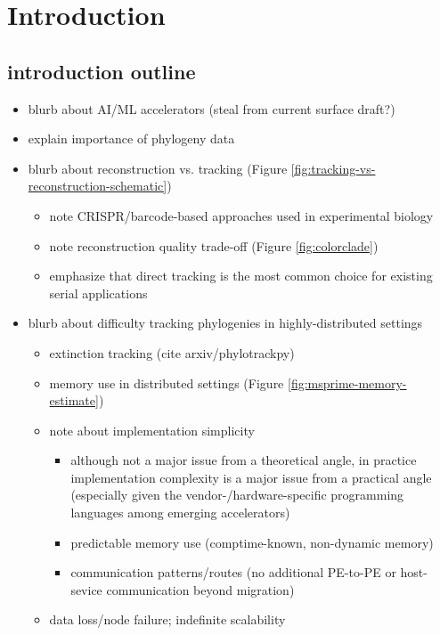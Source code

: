 \section{Introduction} \label{sec:introduction}

\subsection{introduction outline}

\begin{itemize}
\item blurb about AI/ML accelerators (steal from current surface draft?)
\item explain importance of phylogeny data
\item blurb about reconstruction vs. tracking (Figure \ref{fig:tracking-vs-reconstruction-schematic})
    \begin{itemize}
    \item note CRISPR/barcode-based approaches used in experimental biology
    \item note reconstruction quality trade-off (Figure \ref{fig:colorclade})
    \item emphasize that direct tracking is the most common choice for existing serial applications
    \end{itemize}
\item blurb about difficulty tracking phylogenies in highly-distributed settings
   \begin{itemize}
   \item extinction tracking (cite arxiv/phylotrackpy)
   \item memory use in distributed settings (Figure \ref{fig:msprime-memory-estimate})
   \item note about implementation simplicity
      \begin{itemize}
      \item although not a major issue from a theoretical angle, in practice implementation complexity is a major issue from a practical angle (especially given the vendor-/hardware-specific programming languages among emerging accelerators)
      \item predictable memory use (comptime-known, non-dynamic memory)
      \item communication patterns/routes (no additional PE-to-PE or host-sevice communication beyond migration)
      \end{itemize}
   \item data loss/node failure; indefinite scalability

\end{itemize}
\end{itemize}
